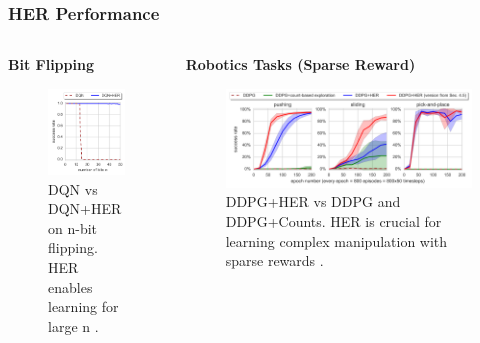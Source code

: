 \documentclass[9pt, aspectratio=169]{beamer}
\begin{document}
\begin{frame}
  \frametitle{HER Performance}
    \begin{columns}[T] %
        \begin{column}{0.2\textwidth}
            \textbf{Bit Flipping}
            \begin{figure}
                \includegraphics[width=\textwidth]{her-bitflip.png}
                \caption{DQN vs DQN+HER on n-bit flipping. HER enables learning for large n \cite{andrychowicz2018hindsightexperiencereplay}.}
            \end{figure}
        \end{column}
        \begin{column}{0.7\textwidth}
            \textbf{Robotics Tasks (Sparse Reward)}
             \begin{figure}
                \includegraphics[width=\textwidth]{her-learning-curve.png}
                \caption{DDPG+HER vs DDPG and DDPG+Counts. HER is crucial for learning complex manipulation with sparse rewards \cite{andrychowicz2018hindsightexperiencereplay}.}
            \end{figure}
        \end{column}
    \end{columns}
    \vspace{1em}
\end{frame}
\end{document}
